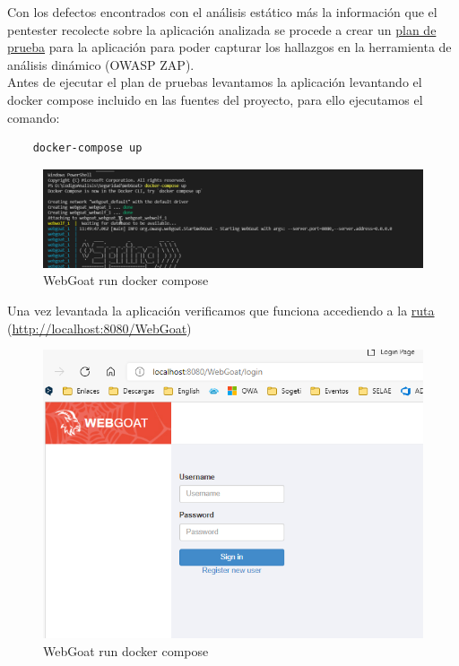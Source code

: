 Con los defectos encontrados con el análisis estático más la información que el pentester recolecte sobre la aplicación analizada 
se procede a crear un \href{https://github.com/M0l1n3ta/PFG/blob/master/Scripts/Plan Pruebas/PlanPruebas_OWASP_WebGoat.ps1}{plan de prueba} para la aplicación para poder capturar los hallazgos en la herramienta de análisis 
dinámico (OWASP ZAP).\\

\newpage
Antes de ejecutar el plan de pruebas levantamos la aplicación levantando el docker compose incluido en las fuentes del proyecto, para ello ejecutamos el comando:

\begin{verbatim}
    docker-compose up
\end{verbatim}

\begin{figure}[!htb]
    \captionsetup{width=1\linewidth}  
    \includegraphics[width=\linewidth]{./imagenes/04_1_1_00_WebGoat_DockerComposeUP.png}
    \caption{WebGoat run docker compose}  
\end{figure}

Una vez levantada la aplicación verificamos que funciona accediendo a la \href{http://localhost:8080/WebGoat}{ruta} (\url{http://localhost:8080/WebGoat})

\begin{figure}[!htb]
    \centering
    \captionsetup{width=1\linewidth}  
    \includegraphics[width=0.8\linewidth]{./imagenes/04_1_1_01_WebGoat_APPRunning.png}
    \caption{WebGoat run docker compose}  
\end{figure}


